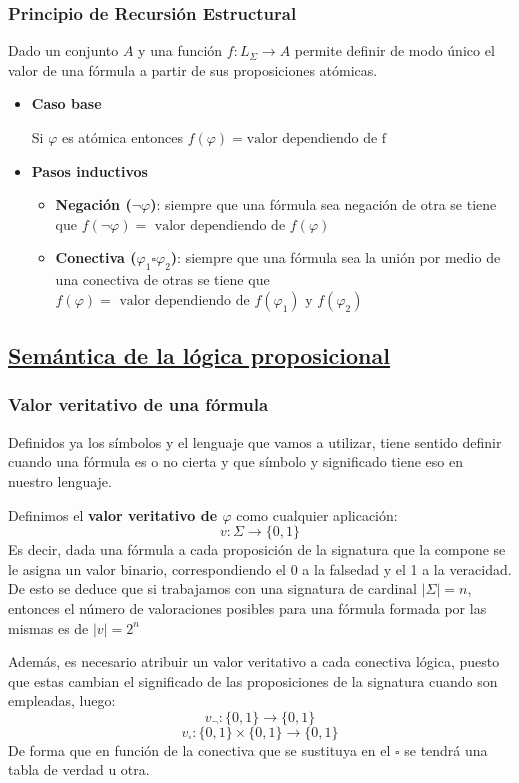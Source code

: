 \documentclass[10pt,a4paper,openright]{book}
\begin{document}
\subsubsection*{Principio de Recursión Estructural}
Dado un conjunto $A$ y una función $f: L_\Sigma \rightarrow A$ permite definir de modo único el valor de una fórmula a partir de sus proposiciones atómicas.
\begin{itemize}
\item \textbf{Caso base}

Si $\varphi$ es atómica entonces $f(\varphi) = \mbox{valor dependiendo de f}$

\item \textbf{Pasos inductivos}
	\begin{itemize}
	\item \textbf{Negación ($\neg \varphi$)}: siempre que una fórmula sea negación de otra se tiene que $f(\neg \varphi)= \mbox{ valor dependiendo de } f(\varphi)$
	
	\item \textbf{Conectiva ($\varphi_1 \square \varphi_2$)}: siempre que una fórmula sea la unión por medio de una conectiva de otras se tiene que $f(\varphi)= \mbox{ valor dependiendo de }f(\varphi_1)\mbox{ y }f(\varphi_2)$
	\end{itemize}
\end{itemize}

\subsection*{\underline{Semántica de la lógica proposicional}}
\subsubsection*{Valor veritativo de una fórmula}
Definidos ya los símbolos y el lenguaje que vamos a utilizar, tiene sentido definir cuando una fórmula es o no cierta y que símbolo y significado tiene eso en nuestro lenguaje.

Definimos el \textbf{valor veritativo de $\varphi$} como cualquier aplicación:
$$v: \Sigma \rightarrow \{0,1\}$$
Es decir, dada una fórmula a cada proposición de la signatura que la compone se le asigna un valor binario, correspondiendo el 0 a la falsedad y el 1 a la veracidad. De esto se deduce que si trabajamos con una signatura de cardinal $|\Sigma| = n$, entonces el número de valoraciones posibles para una fórmula formada por las mismas es de $|v| = 2^n$

Además, es necesario atribuir un valor veritativo a cada conectiva lógica, puesto que estas cambian el significado de las proposiciones de la signatura cuando son empleadas, luego:
$$v_\neg : \{0,1\}\rightarrow \{0,1\}$$
$$v_\square : \{0,1\}\times \{0,1\}\rightarrow \{0,1\}$$
De forma que en función de la conectiva que se sustituya en el $\square$ se tendrá una tabla de verdad u otra.
\end{document}
